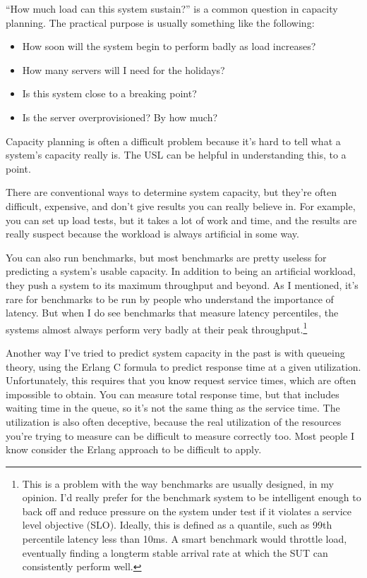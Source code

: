 \documentclass{vivid_layout}
\begin{document}
``How much load can this system sustain?'' is a common question in capacity
planning. The practical purpose is usually something like the following:

\begin{itemize}
\item How soon will the system begin to perform badly as load increases?
\item How many servers will I need for the holidays?
\item Is this system close to a breaking point?
\item Is the server overprovisioned? By how much?
\end{itemize}

Capacity planning is often a difficult problem because it's hard to tell what a
system's capacity really is. The USL can be helpful in understanding this, to a
point.

There are conventional ways to determine system capacity, but they're often
difficult, expensive, and don't give results you can really believe in. For
example, you can set up load tests, but it takes a lot of work and time, and the
results are really suspect because the workload is always artificial in some
way.

You can also run benchmarks, but most benchmarks are pretty useless for
predicting a system's usable capacity. In addition to being an artificial
workload, they push a system to its maximum throughput and beyond. As I
mentioned, it's rare for benchmarks to be run by people who understand the
importance of latency. But when I do see benchmarks that measure latency
percentiles, the systems almost always perform very badly at their peak
throughput.\footnote{This is a problem with the way benchmarks are usually
designed, in my opinion. I'd really prefer for the benchmark system to be
intelligent enough to back off and reduce pressure on the system under test if
it violates a service level objective (SLO).  Ideally, this is defined as a
quantile, such as 99th percentile latency less than 10ms.  A smart benchmark
would throttle load, eventually finding a longterm stable arrival rate at which
the SUT can consistently perform well.}

Another way I've tried to predict system capacity in the past is with queueing
theory, using the Erlang C formula to predict response time at a given
utilization.  Unfortunately, this requires that you know request service times,
which are often impossible to obtain. You can measure total response time, but
that includes waiting time in the queue, so it's not the same thing as the
service time. The utilization is also often deceptive, because the real
utilization of the resources you're trying to measure can be difficult to
measure correctly too. Most people I know consider the Erlang approach to be
difficult to apply.
\end{document}
